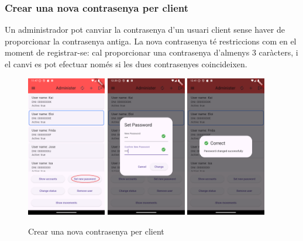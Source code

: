 \documentclass[a4paper,12pt,twoside]{ThesisStyle}
\begin{document}
\clearpage
\subsubsection{Crear una nova contrasenya per client}
\label{subsubsec: Crear una nova contrasenya per client}

Un administrador pot canviar la contrasenya d'un usuari client sense haver de proporcionar la contrasenya antiga. La nova contrasenya té restriccions com en el moment de registrar-se: cal proporcionar una contrasenya d'almenys 3 caràcters, i el canvi es pot efectuar només si les dues contrasenyes coincideixen.

\begin{figure}[h]
    \centering
    \includegraphics[width=0.31\textwidth]{imatges/mainAdmin2.png}
    \includegraphics[width=0.31\textwidth]{imatges/setPassword2.png}
    \includegraphics[width=0.31\textwidth]{imatges/setPassword3.png}
    \caption{Crear una nova contrasenya per client}
    \label{fig: Crear una nova contrasenya per client}
\end{figure}
\end{document}
